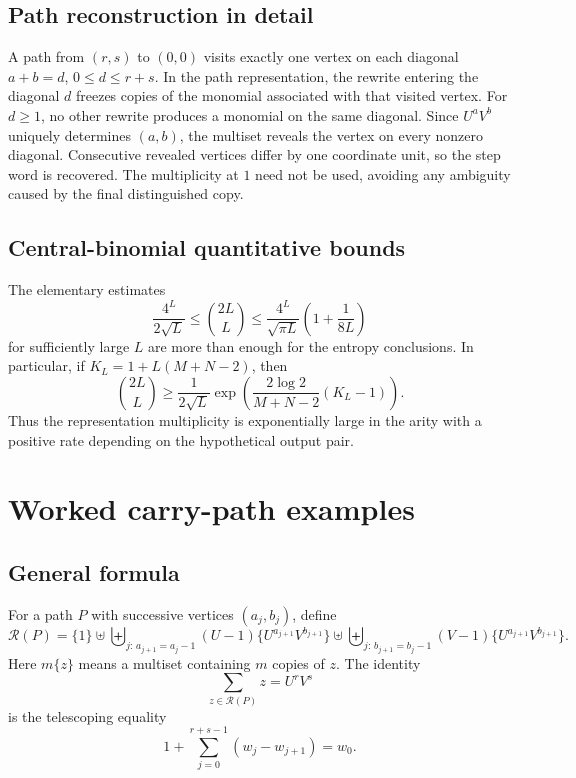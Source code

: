 \documentclass[11pt,oneside]{article}
\theoremstyle{definition}
\begin{document}
\subsection{Path reconstruction in detail}

A path from $(r,s)$ to $(0,0)$ visits exactly one vertex on each diagonal
$a+b=d$, $0\le d\le r+s$.  In the path representation, the rewrite entering the diagonal $d$ freezes copies of the monomial associated with that visited vertex.  For $d\ge1$, no other rewrite produces a monomial on the same diagonal.  Since $U^aV^b$ uniquely determines $(a,b)$, the multiset reveals the vertex on every nonzero diagonal.  Consecutive revealed vertices differ by one coordinate unit, so the step word is recovered.  The multiplicity at $1$ need not be used, avoiding any ambiguity caused by the final distinguished copy.

\subsection{Central-binomial quantitative bounds}

The elementary estimates
\[
       \frac{4^L}{2\sqrt L}
       \le\binom{2L}{L}
       \le\frac{4^L}{\sqrt{\pi L}}
       \left(1+\frac{1}{8L}\right)
\]
for sufficiently large $L$ are more than enough for the entropy conclusions.  In particular, if
$K_L=1+L(M+N-2)$, then
\[
 \binom{2L}{L}
 \ge \frac{1}{2\sqrt L}
     \exp\!\left(
       \frac{2\log2}{M+N-2}(K_L-1)
     \right).
\]
Thus the representation multiplicity is exponentially large in the arity with a positive rate depending on the hypothetical output pair.

\section{Worked carry-path examples}

\subsection{General formula}

For a path $P$ with successive vertices $(a_j,b_j)$, define
\[
 \mathcal R(P)=\{1\}
 \uplus\!\biguplus_{j:\,a_{j+1}=a_j-1}
       (U-1)\{U^{a_{j+1}}V^{b_{j+1}}\}
 \uplus\!\biguplus_{j:\,b_{j+1}=b_j-1}
       (V-1)\{U^{a_{j+1}}V^{b_{j+1}}\}.
\]
Here $m\{z\}$ means a multiset containing $m$ copies of $z$.
The identity
\[
       \sum_{z\in\mathcal R(P)}z=U^rV^s
\]
is the telescoping equality
\[
       1+\sum_{j=0}^{r+s-1}(w_j-w_{j+1})=w_0.
\]
\end{document}
